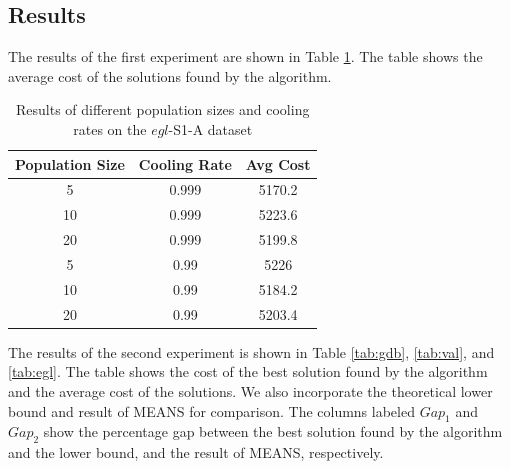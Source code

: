 \documentclass[conference]{IEEEtran}
\begin{document}
\subsection{Results}

The results of the first experiment are shown in Table \ref{tab:pop and cooling}.
The table shows the average cost of the solutions found by the algorithm.
\begin{table}[h]
    \centering
    \begin{tabular}{ccc}
        \toprule
        Population Size & Cooling Rate & Avg Cost\\
        \midrule
        5 & 0.999 & 5170.2 \\
        10 & 0.999 & 5223.6 \\
        20 & 0.999 & 5199.8 \\
        5 & 0.99 & 5226 \\
        10 & 0.99 & 5184.2 \\
        20 & 0.99 & 5203.4 \\
        \bottomrule
    \end{tabular}
    \caption{Results of different population sizes and cooling rates on the $egl$-S1-A dataset}
    \label{tab:pop and cooling}
\end{table}

The results of the second experiment is shown in Table \ref{tab:gdb}, \ref{tab:val}, and \ref{tab:egl}.
The table shows the cost of the best solution found by the algorithm and the average cost of the solutions.
We also incorporate the theoretical lower bound and result of MEANS \cite{MEANS} for comparison.
The columns labeled $Gap_1$ and $Gap_2$ show the percentage gap between the best solution found by the algorithm and the lower bound, and the result of MEANS, respectively.
\end{document}
